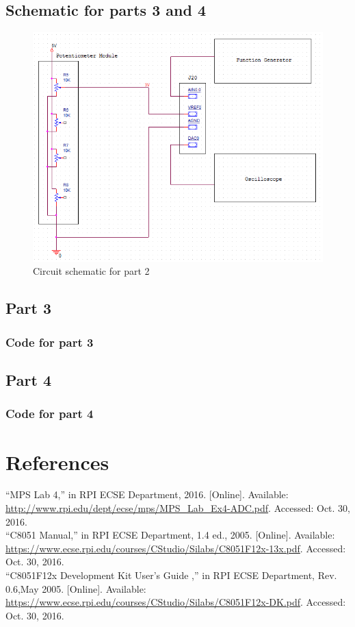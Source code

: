 \documentclass[12pt]{article}
\begin{document}
\subsection{Schematic for parts 3 and 4}
	\begin{figure}[H]
		\centering
		\includegraphics[]{Part2.png}
		\caption{Circuit schematic for part 2}
		\label{schematic2}
	\end{figure} 
\subsection{Part 3}
	\subsubsection{Code for part 3}
			

\subsection{Part 4}
	\subsubsection{Code for part 4}
		
	
\section{References} 
\noindent
``MPS Lab 4,'' in RPI ECSE Department, 2016. [Online]. Available: \url{http://www.rpi.edu/dept/ecse/mps/MPS_Lab_Ex4-ADC.pdf}. Accessed: Oct. 30, 2016.\\
\newline\noindent
``C8051 Manual,'' in RPI ECSE Department, 1.4 ed., 2005. [Online]. Available: \url{https://www.ecse.rpi.edu/courses/CStudio/Silabs/C8051F12x-13x.pdf}. Accessed: Oct. 30, 2016.\\
\newline\noindent
``C8051F12x Development Kit User's Guide ,'' in RPI ECSE Department, Rev. 0.6,May 2005. [Online]. Available: \url{https://www.ecse.rpi.edu/courses/CStudio/Silabs/C8051F12x-DK.pdf}. Accessed: Oct. 30, 2016.
\end{document}
